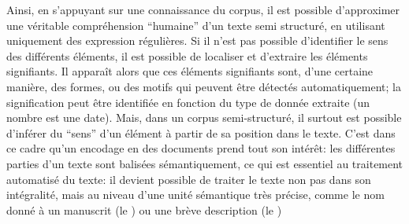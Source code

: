 

Ainsi, en s'appuyant sur une connaissance du corpus, il est possible d'approximer une véritable compréhension \enquote{humaine} d'un texte semi structuré, en utilisant uniquement des \glspl{expression régulière}. Si il n'est pas possible d'identifier le sens des différents éléments, il est possible de localiser et d'extraire les éléments signifiants. Il apparaît alors que ces éléments signifiants sont, d'une certaine manière, des formes, ou des motifs qui peuvent être détectés automatiquement; la signification peut être identifiée en fonction du type de donnée extraite (un nombre est une date). Mais, dans un corpus semi-structuré, il surtout est possible d'inférer du \enquote{sens} d'un élément à partir de sa position dans le texte. C'est dans ce cadre qu'un encodage en \xmltei{} des documents prend tout son intérêt: les différentes parties d'un texte sont balisées sémantiquement, ce qui est essentiel au traitement automatisé du texte: il devient possible de traiter le texte non pas dans son intégralité, mais au niveau d'une unité sémantique très précise, comme le nom donné à un manuscrit (le \tname{}) ou une brève description (le \ttrait{})